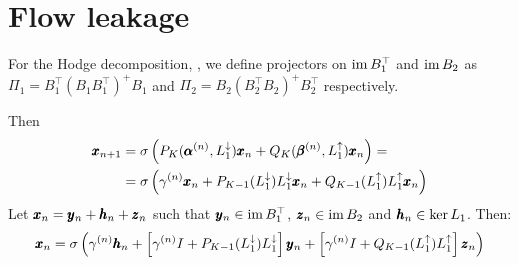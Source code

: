 \documentclass{mynotes}
\begin{document}
\section{Flow leakage}

For the Hodge decomposition, , we define projectors on \( \operatorname{im} B_1^\top \) and \( \operatorname{im} B_2 \) as \( \Pi_1 = B_1^\top \left( B_1 B_1^\top \right)^+ B_1 \) and \( \Pi_2 = B_2 \left( B_2^\top B_2 \right)^+ B_2^\top  \) respectively.

Then 
\begin{equation}
      \begin{aligned}
            \pmb{x}_{n+1} & =  \sigma \left( P_K( \pmb{\alpha}^{(n)}, L_{1}^{\downarrow}) \pmb{x}_n + Q_K( \pmb{\beta}^{(n)}, L_{1}^{\uparrow}) \pmb{x}_n  \right) = \\
            & = \sigma \left( \gamma^{(n)} \pmb{x}_n + P_{K-1}(L_{1}^{\downarrow})  L_{1}^{\downarrow} \pmb{x}_n +Q_{K-1} (L_{1}^{\uparrow})  L_{1}^{\uparrow}  \pmb{x}_n \right)
      \end{aligned}
\end{equation}
Let \( \pmb{x}_n = \pmb{y}_n + \pmb{h}_n + \pmb{z}_n\) such that \( \pmb{y}_n \in \operatorname{im} B_1^\top \), \( \pmb{z}_n \in \operatorname{im} B_2 \) and \( \pmb{h}_n \in \ker L_1 \). Then:
\begin{equation}
      \pmb{x}_n = \sigma \left( \gamma^{(n)} \pmb{h}_n + \left[ \gamma^{(n)} I + P_{K-1}(L_{1}^{\downarrow}) L_{1}^{\downarrow}  \right]  \pmb{y}_n + \left[ \gamma^{(n)} I + Q_{K-1}(L_{1}^{\uparrow}) L_{1}^{\uparrow}  \right]  \pmb{z}_n \right)
\end{equation}
\end{document}

